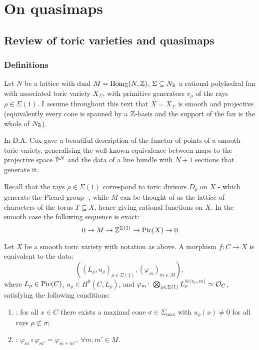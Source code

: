 \chapter{On quasimaps}

\section{Review of toric varieties and quasimaps}

\subsection{Definitions} Let $N$ be a lattice with dual $M=\operatorname{Hom}_{\mathbb{Z}}(N,\mathbb{Z})$, $\Sigma\subseteq N_{\mathbb{R}}$ a rational polyhedral fan with associated toric variety $X_{\Sigma}$, with primitive generators $v_{\rho}$ of the rays $\rho\in\Sigma(1)$. I assume throughout this text that $X=X_{\Sigma}$ is smooth and projective (equivalently every cone is spanned by a $\mathbb{Z}$-basis and the support of the fan is the whole of $N_{\mathbb{R}}$).

In \cite{CoxFunctor} D.A. Cox gave a beautiful description of the functor of points of a smooth toric variety, generalising the well-known equivalence between maps to the projective space $\mathbb P^N$ and the data of a line bundle with $N+1$ sections that generate it.

Recall that the rays $\rho\in\Sigma(1)$ correspond to toric divisors $D_{\rho}$ on $X$ - which generate the Picard group -, while $M$ can be thought of as the lattice of characters of the torus $T\subseteq X$, hence giving rational functions on $X$. In the smooth case the following sequence is exact:
\begin{equation}\label{eq:toric_Pic_es} 0\rightarrow M\rightarrow \mathbb{Z}^{\Sigma(1)}\rightarrow \operatorname{Pic}(X)\rightarrow 0\end{equation}

\begin{thm}[Cox]
 Let $X$ be a smooth toric variety with notation as above. A morphism $f\colon C\to X$ is equivalent to the data:
 \[\left((L_\rho,u_\rho)_{\rho\in\Sigma(1)},(\varphi_m)_{m\in M}\right),\]
 where $L_\rho\in\operatorname{Pic}(C)$, $u_\rho\in H^0(C,L_\rho)$, and $\varphi_m\colon \bigotimes_{\rho\in\Sigma(1)}L_\rho^{\otimes \langle v_\rho, m\rangle}\simeq \mathcal{O}_C$, satisfying the following conditions:
 \begin{enumerate}
\item {}: for all $x \in C$ there exists a maximal cone $\sigma \in \Sigma_{\operatorname{max}}$ with $u_\rho(x) \neq 0$ for all rays $\rho \not\subset \sigma$;
\item {}: $\varphi_m\circ\varphi_{m'}=\varphi_{m+m'},\ \forall m,m'\in M$.
\end{enumerate}
\end{thm}

